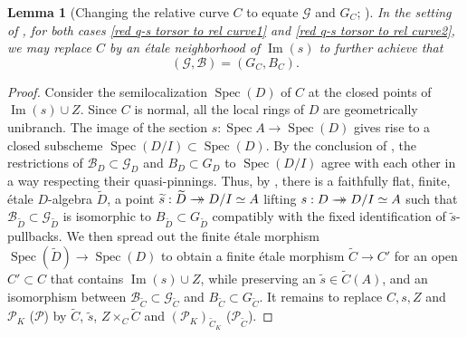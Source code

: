\documentclass[JEP,XML,SOM,Unicode,published]{cedram}
\newcommand{\onto}{\mathchoice{\to\hspace*{-5mm}\to}{\to\hspace*{-2.85mm}\to}{\to\hspace*{-3mm}\to}{\to\hspace*{-3mm}\to}}
\newcommand{\cP}{\mathcal{P}}
\newcommand{\sB}{\mathscr{B}}
\newcommand{\sG}{\mathscr{G}}
\let\wt\widetilde
\DeclareMathOperator{\im}{Im}
\DeclareMathOperator{\Spec}{Spec}
\newcommand{\bpf}{\begin{proof}}
\newcommand{\epf}{\end{proof}}
\newcommand{\blemt}{\begin{lemma-tweak}}
\newcommand{\elemt}{\end{lemma-tweak}}
\theoremstyle{plain}
\newtheorem{lemma-tweak}[subsection]{Lemma}
\theoremstyle{definition}
\begin{document}
\blemt [Changing the relative curve $C$ to equate $\sG$ and $G_C$; {\cf \cite[Prop.\,5.2]{Ces22a}}]
\label{Changing the rel cur to equ.}
In the setting of , for both cases \eqref{red q-s torsor to rel curve1} and \eqref{red q-s torsor to rel curve2}, we may replace $C$ by an étale neighborhood of $\im(s) $ to further achieve that
\[
(\sG,\sB)=(G_C,B_C).
\]
\elemt
\bpf
Consider the semilocalization $\Spec (D)$ of $C$ at the closed points of $\im(s)\cup Z$. Since $C$ is normal, all the local rings of $D$ are geometrically unibranch. The image of the section $s:\Spec A\to \Spec (D)$ gives rise to a closed subscheme $\Spec (D/I) \subset \Spec (D)$. By the conclusion of , the restrictions of $\sB_D \subset \sG_D$ and $B_D\subset G_D$ to $\Spec (D/I)$ agree with each other in a way respecting their quasi-pinnings. Thus, by , there is a faithfully flat, finite, étale $D$-algebra $\wt{D}$, a point $\wt{s}:\wt{D} \onto D/I \simeq A$ lifting $s:D \onto D/I \simeq A$ such that $\sB_{\wt{D}} \subset \sG_{\wt{D}}$ is isomorphic to $B_{\wt{D}}\subset G_{\wt{D}}$ compatibly with the fixed identification of $\wt{s}$-pullbacks. We then spread out the finite étale morphism $\Spec (\wt{D})\to \Spec (D)$ to obtain a finite étale morphism $\wt{C}\to C'$ for an open $C'\subset C$ that contains $\im(s)\cup Z$, while preserving an $\wt{s}\in \wt{C}(A)$, and an isomorphism between $\sB_{\wt{C}} \subset \sG_{\wt{C}}$ and $B_{\wt{C}}\subset G_{\wt{C}}$. It remains to replace $C,s,Z$ and $\cP_K$ (\resp $\cP$) by $\wt{C}$, $\wt{s}$, $Z\times_C\wt{C}$ and $(\cP_K)_{\wt{C}_K}$ (\resp $\cP_{\wt{C}}$).
\epf
\end{document}
